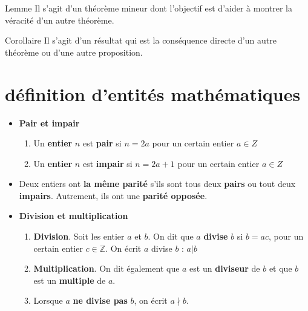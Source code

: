 \documentclass[16pt]{report}
\begin{document}
\begin{multicols*}{2}
            \begin{Definitionx}{Lemme}{}
                        Il s'agit d'un théorème mineur dont l'objectif est d'aider à montrer la véracité d'un autre 
                        théorème. 
            \end{Definitionx}

            \begin{Definitionx}{Corollaire}{}
                        Il s'agit d'un résultat qui est la conséquence directe d'un autre théorème ou d'une 
                        autre proposition. 
            \end{Definitionx}


            \pagebreak
            \section{définition d'entités mathématiques}

            \begin{itemize}
                \item \textcolor{myp}{\textbf{Pair et impair}} 
                    \begin{enumerate}
                        \item Un \textbf{entier} $n$ est \textbf{\textcolor{myb}{pair}} si $n = 2a$ 
                    pour un certain entier $a \in Z$
                        \item Un \textbf{entier} $n$ est \textbf{\textcolor{myb}{impair}} si $n = 2a + 1$ 
                    pour un certain entier $a \in Z$
                    \end{enumerate}

                \item Deux entiers ont \textbf{\textcolor{myb}{la même parité}} s'ils sont tous deux 
                    \textbf{pairs} ou tout deux \textbf{impairs}. 
                    Autrement, ils ont une \textbf{\textcolor{myb}{parité opposée}}. 
                \item \textcolor{myp}{\textbf{Division et multiplication}}

                \begin{enumerate}
                    \item \textcolor{myb}{\textbf{Division}}. Soit les entier $a$ et $b$. On dit que 
                        $a$ \textbf{\textcolor{myb}{divise}} $b$ si $b = ac$, pour un certain entier $c \in \mathbb{Z}$.
                        On écrit $a$ divise $b$ : $a | b$
                    \item \textcolor{myb}{\textbf{Multiplication}}. On dit également que $a$ est un 
                        \textcolor{myb}{\textbf{diviseur}}   de $b$ et que $b$ est un 
                        \textbf{\textcolor{myb}{multiple}} de $a$.
                    \item Lorsque $a$ \textcolor{myb}{\textbf{ne divise pas}} $b$, on écrit $a \nmid b$. 
                \end{enumerate}


\end{itemize}
\end{multicols*}
\end{document}
